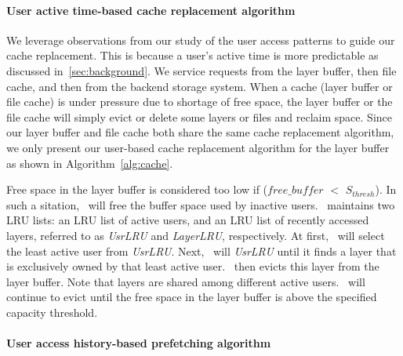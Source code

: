 \paragraph{User active time-based cache replacement algorithm}



We leverage observations from our study of the user access patterns to guide our cache replacement. This is because
a user's active time is more predictable as discussed in~\cref{sec:background}.
We service requests from the layer buffer, then file cache, and then from the backend storage system. 
When a cache (layer buffer or file cache) is under pressure due to 
shortage of free space,
the layer buffer or the file cache will simply evict or delete some layers or files and reclaim space.
Since our layer buffer and file cache both share the same cache replacement algorithm, we only present
our user-based cache replacement algorithm for the layer buffer as shown in Algorithm~\ref{alg:cache}.

Free space in the layer buffer is considered too low if ($free\_buffer$ $<$ $S_{thresh}$). 
In such a sitation, \sysname~will free the buffer space used by inactive users. 
\sysname~maintains two LRU lists: an LRU list of active users, and
an LRU list of recently accessed layers, referred to as \emph{UsrLRU} and \emph{LayerLRU}, respectively.
At first, \sysname~will select the least active user from \emph{UsrLRU}.
Next, \sysname~will  \emph{UsrLRU} until it finds a layer that is exclusively owned by that least active user. 
\sysname~then evicts this layer from the layer buffer. 
 Note that layers are shared among different active users.
 \sysname~will continue to evict until the free space in the layer buffer is above the specified capacity threshold.
 

\paragraph{User access history-based prefetching algorithm}

